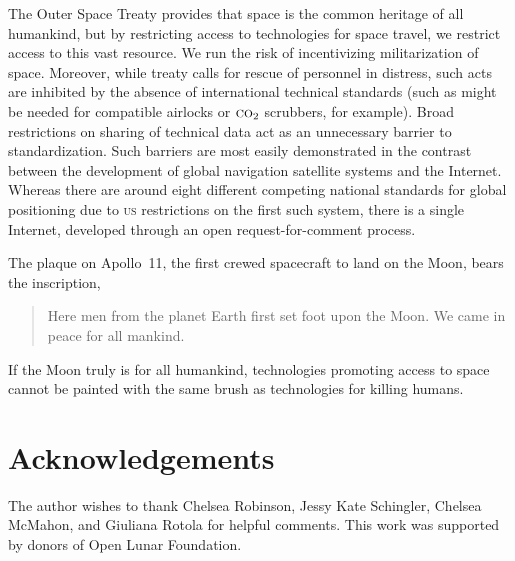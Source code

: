 \documentclass[12pt]{olfmemo}
\begin{document}
The Outer Space Treaty provides that space is the common heritage of all humankind, but by restricting access to technologies for space travel, we restrict access to this vast resource. We run the risk of incentivizing militarization of space. Moreover, while treaty calls for rescue of personnel in distress, such acts are inhibited by the absence of international technical standards (such as might be needed for compatible airlocks or $\textsc{co}_2$ scrubbers, for example). Broad restrictions on sharing of technical data act as an unnecessary barrier to standardization. Such barriers are most easily demonstrated in the contrast between the development of global navigation satellite systems and the Internet. Whereas there are around eight different competing national standards for global positioning due to \textsc{us} restrictions on the first such system, there is a single Internet, developed through an open request-for-comment process.

The plaque on Apollo~11, the first crewed spacecraft to land on the Moon, bears the inscription,
\begin{quote}Here men from the planet Earth first set foot upon the Moon. We came in peace for all mankind.\end{quote} If the Moon truly is for all humankind, technologies promoting access to space cannot be painted with the same brush as technologies for killing humans.

\section{Acknowledgements}
The author wishes to thank Chelsea Robinson, Jessy Kate Schingler, Chelsea McMahon, and Giuliana Rotola for helpful comments. This work was supported by donors of Open Lunar Foundation.

%
%   
\end{document}
